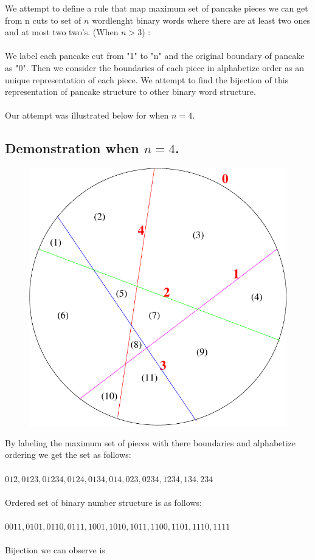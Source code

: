 \documentclass[a4paper,10pt]{article}
\begin{document}
We attempt to define a rule that map maximum set of pancake pieces we can get from n cuts to set of $n$ wordlenght binary words where there are at least two ones and at most two two's. (When  $n > 3$) : \\
\\
We label each pancake cut from "1" to "n" and the original boundary of pancake as "0". Then we consider the boundaries of each piece in alphabetize order as an unique representation of each piece. We attempt to find the bijection of this representation of pancake structure to other binary word structure.\\
\\
Our attempt was illustrated below for when $n=4$.    	    
\\	
\subsection{Demonstration when $n=4$.}
\begin{figure}[h!]
			\includegraphics[scale=0.5]{graphics/pancakecut11_bijec}
			\captionsetup{labelformat=empty}
			\caption{}
			\label{fig:pancakecut11}
\end{figure}

By labeling the maximum set of pieces with there boundaries and alphabetize ordering we get the set as follows:\\
\\
${012,0123,01234,0124,0134,014,023,0234,1234,134,234}$ \\
\\
Ordered set of binary number structure is as follows:\\
\\
${0011, 0101, 0110, 0111, 1001, 1010, 1011, 1100, 1101, 1110, 1111}$\\
\\
Bijection we can observe is
%
%
\end{document}
